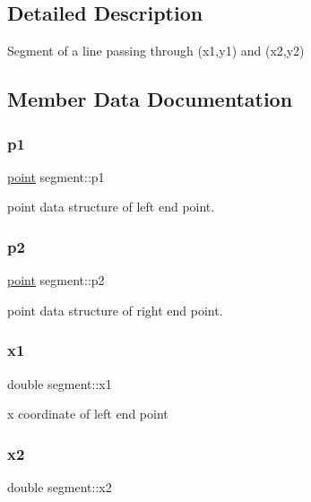 \subsection{Detailed Description}
Segment of a line passing through (x1,y1) and (x2,y2) 

\subsection{Member Data Documentation}
\mbox{\label{structsegment_a352137cd1482d20b132df4d2f864e85e}} 
\subsubsection{\texorpdfstring{p1}{p1}}
{\footnotesize\ttfamily \hyperlink{structpoint}{point} segment\+::p1}



point data structure of left end point. 

\mbox{\label{structsegment_a057df1ea382aaafbdf0b76d0631e4ada}} 
\subsubsection{\texorpdfstring{p2}{p2}}
{\footnotesize\ttfamily \hyperlink{structpoint}{point} segment\+::p2}



point data structure of right end point. 

\mbox{\label{structsegment_a2ddfc4d7098219fce29a99c188459b1f}} 
\subsubsection{\texorpdfstring{x1}{x1}}
{\footnotesize\ttfamily double segment\+::x1}



x coordinate of left end point 

\mbox{\label{structsegment_a9157415f277d54e5883c5c9cd8b8b530}} 
\subsubsection{\texorpdfstring{x2}{x2}}
{\footnotesize\ttfamily double segment\+::x2}




